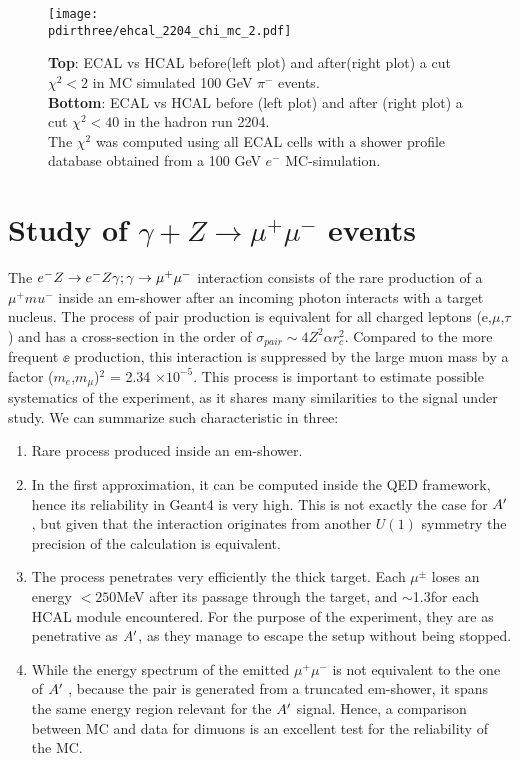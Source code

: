 \begin{figure}[h!]
  \begin{center}
    \texttt{[image: \\pdirthree/ehcal\_2204\_chi\_mc\_2.pdf]}
  \end{center}
  \caption{\textbf{Top}: ECAL vs HCAL before(left plot) and
    after(right plot) a cut
    $\chi^2<2$ in MC simulated 100 GeV $\pi^-$ events. \\
    \textbf{Bottom}: ECAL vs HCAL before (left plot) and after (right
    plot) a cut
    $\chi^2<40$ in the hadron run 2204.\\
    The $\chi^2$ was computed using all ECAL cells with a shower
    profile database obtained from a 100 GeV $e^-$ MC-simulation. }
  \label{fig:ehcal_hadr}
\end{figure}
\fi
\clearpage
\newpage

\section{Study of $\gamma + Z \rightarrow \mu^+ \mu^-$ events }
\label{ch3:sec:dimuons}

The $e^- Z \to e^- Z \gamma; \gamma \to \mu^+ \mu^-$ interaction consists of the rare production of a $\mu^+mu^-$ inside an em-shower after an incoming photon interacts with a target nucleus. The process of pair production is equivalent for all charged leptons (e,$\mu$,$\tau$) and has a cross-section in the order of $\sigma_{pair} \sim 4Z^2\alpha r^2_c$. Compared to the more frequent $\ee$ production, this interaction is suppressed by the large muon mass by a factor ($m_e$,$m_{\mu}$)$^2$ = 2.34 $\times 10^{-5}$. This process is important to estimate possible systematics of the experiment, as it shares many similarities to the signal under study. We can summarize such characteristic in three:

\begin{enumerate}
\item Rare process produced inside an em-shower.
\item In the first approximation, it can be computed inside the QED framework, hence its reliability in Geant4 is very high. This is not exactly the case for $A'$, but given that the interaction originates from another $U(1)$ symmetry the precision of the calculation is equivalent.
\item The process penetrates very efficiently the thick target. Each $\mu^{\pm}$ loses an energy $<250$\si{\mega\electronvolt} after its passage through the target, and $\sim$1.3\gev for each HCAL module encountered. For the purpose of the experiment, they are as penetrative as $A'$, as they manage to escape the setup without being stopped.
\item While the energy spectrum of the emitted $\mu^+\mu^-$ is not equivalent to the one of $A'$ \cite{dimuon-mc}, because the pair is generated from a truncated em-shower, it spans the same energy region relevant for the $A'$ signal. Hence, a comparison between MC and data for dimuons is an excellent test for the reliability of the MC.
\end{enumerate}

